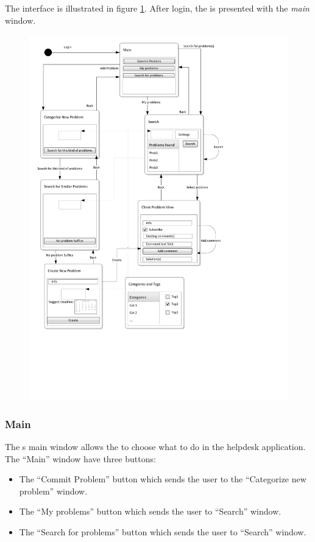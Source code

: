 \subsection{\cinterface}
\label{sec:client_interface}

The \aclient[] interface is illustrated in figure \ref{fig:client_interface}.
After login, the \aclient[] is presented with the \textit{main} window. 


\begin{figure}[p]
	\centering
		\includegraphics[width = \textwidth, clip=true, trim=0 4cm 5cm 0]{input/application_domain_analysis/Navigation_DiagramClient.pdf}
	\label{fig:client_interface} %
\end{figure}

\subsubsection{Main}
The \aclient s main window allows the \aclient[] to choose what to do in the helpdesk application. The ``Main'' window have three buttons:
\begin{itemize}
	\item The ``Commit Problem'' button which sends the user to the ``Categorize new problem'' window.
	\item The ``My problems'' button which sends the user to ``Search'' window.
	\item The ``Search for problems'' button which sends the user to ``Search'' window.
\end{itemize}

